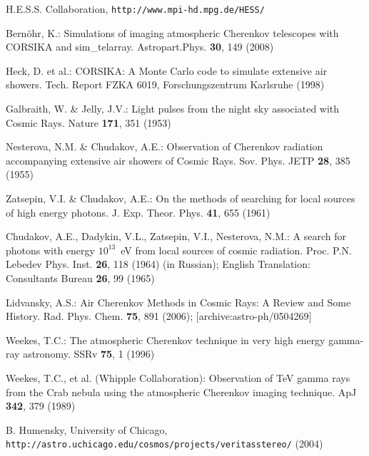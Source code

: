 \documentclass{svjour3x}                     %
\begin{document}
\clearpage
\begin{thebibliography}{}
%
%

 H.E.S.S. Collaboration,
{\tt http://www.mpi-hd.mpg.de/HESS/}

Bern\"ohr, K.: Simulations of imaging atmospheric Cherenkov telescopes with
CORSIKA and sim\_telarray.
Astropart.Phys. {\bf 30}, 149 (2008)

 Heck, D. et al.: CORSIKA: A Monte Carlo code to simulate extensive air showers.
 Tech. Report FZKA 6019,
 Forschungszentrum Karlsruhe (1998)

 Galbraith, W. \& Jelly, J.V.: Light pulses from the night sky associated with
 Cosmic Rays. Nature {\bf 171}, 351 (1953)
 
  Nesterova, N.M. \& Chudakov, A.E.: Observation of
  Cherenkov radiation accompanying extensive air showers of Cosmic
  Rays. Sov. Phys. JETP {\bf 28}, 385 (1955)

 Zatsepin, V.I. \& Chudakov, A.E.: On the methods of searching for local
 sources of high energy photons. J. Exp. Theor. Phys. {\bf 41}, 655 (1961)

Chudakov, A.E., Dadykin, V.L., Zatsepin, V.I., Nesterova, N.M.: A search for
photons with energy $10^{13}$~eV from local sources of cosmic radiation.
Proc. P.N. Lebedev Phys. Inst. {\bf 26}, 118 (1964) (in Russian); English
Translation: Consultants Bureau {\bf 26}, 99 (1965)

Lidvansky, A.S.: Air Cherenkov Methods in Cosmic Rays: A Review and Some
History. Rad. Phys. Chem. {\bf 75}, 891 (2006); [archive:astro-ph/0504269]

Weekes, T.C.: The atmospheric Cherenkov technique in very high energy gamma-ray
astronomy. SSRv {\bf 75}, 1 (1996)

 Weekes, T.C., et al. (Whipple Collaboration): Observation of
TeV gamma rays from the Crab nebula using the atmospheric Cherenkov imaging
technique. ApJ {\bf 342}, 379 (1989)

 B. Humensky, University of Chicago, \\
  {\tt http://astro.uchicago.edu/cosmos/projects/veritasstereo/} (2004)


\end{thebibliography}
\end{document}
